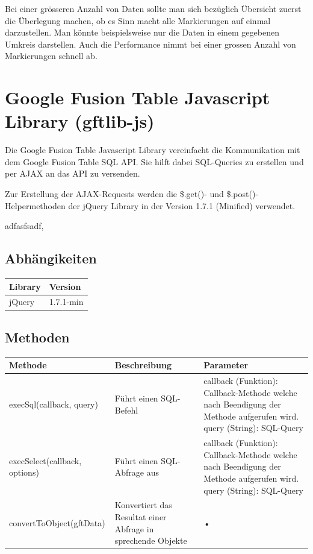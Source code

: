 Bei einer grösseren Anzahl von Daten sollte man sich bezüglich Übersicht zuerst die Überlegung machen, ob es Sinn macht alle Markierungen auf einmal darzustellen. Man könnte beispielsweise nur die Daten in einem gegebenen Umkreis darstellen. Auch die Performance nimmt bei einer grossen Anzahl von Markierungen schnell ab.

\section{Google Fusion Table Javascript Library (gftlib-js)}
Die Google Fusion Table Javascript Library vereinfacht die Kommunikation mit dem Google Fusion Table SQL API. Sie hilft dabei SQL-Queries zu erstellen und per AJAX an das API zu versenden.

Zur Erstellung der AJAX-Requests werden die \$.get()- und \$.post()-Helpermethoden der jQuery Library in der Version 1.7.1 (Minified) verwendet.

adfasfsadf,

\subsection{Abhängikeiten}
\begin{tabular}{|l|l|}
\hline 
Library & Version \\ 
\hline 
jQuery & 1.7.1-min \\ 
\hline 
\end{tabular} 

\subsection{Methoden}
\begin{tabular}{|l|p{5cm}|p{5cm}|}
\hline 
Methode & Beschreibung & Parameter \\ 
\hline 
execSql(callback, query) & Führt einen SQL-Befehl & callback (Funktion): Callback-Methode welche nach Beendigung der Methode aufgerufen wird. query (String): SQL-Query \\ 
\hline 
execSelect(callback, options) & Führt einen SQL-Abfrage aus & callback (Funktion): Callback-Methode welche nach Beendigung der Methode aufgerufen wird. query (String): SQL-Query \\ 
\hline 
convertToObject(gftData) & Konvertiert das Resultat einer Abfrage in sprechende Objekte & • \\ 
\hline 
\end{tabular} 
